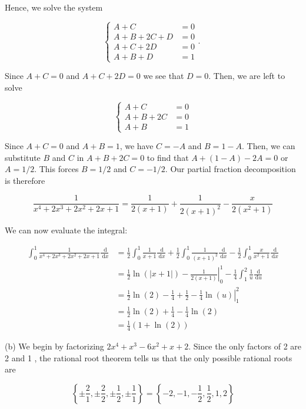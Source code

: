 \documentclass[10pt]{article}
\begin{document}
Hence, we solve the system

$$
\left\{\begin{aligned}
A+C & =0 \\
A+B+2 C+D & =0 \\
A+C+2 D & =0 \\
A+B+D & =1
\end{aligned}\right. \text {. }
$$

Since $A+C=0$ and $A+C+2 D=0$ we see that $D=0$. Then, we are left to solve

$$
\left\{\begin{aligned}
A+C & =0 \\
A+B+2 C & =0 \\
A+B & =1
\end{aligned}\right.
$$

Since $A+C=0$ and $A+B=1$, we have $C=-A$ and $B=1-A$. Then, we can substitute $B$ and $C$ in $A+B+2 C=0$ to find that $A+(1-A)-2 A=0$ or $A=1 / 2$. This forces $B=1 / 2$ and $C=-1 / 2$. Our partial fraction decomposition is therefore

$$
\frac{1}{x^{4}+2 x^{3}+2 x^{2}+2 x+1}=\frac{1}{2(x+1)}+\frac{1}{2(x+1)^{2}}-\frac{x}{2\left(x^{2}+1\right)}
$$

We can now evaluate the integral:

$$
\begin{aligned}
\int_{0}^{1} \frac{1}{x^{4}+2 x^{3}+2 x^{2}+2 x+1} \frac{\mathrm{~d}}{\mathrm{~d} x} & =\frac{1}{2} \int_{0}^{1} \frac{1}{x+1} \frac{\mathrm{~d}}{\mathrm{~d} x}+\frac{1}{2} \int_{0}^{1} \frac{1}{(x+1)^{2}} \frac{\mathrm{~d}}{\mathrm{~d} x}-\frac{1}{2} \int_{0}^{1} \frac{x}{x^{2}+1} \frac{\mathrm{~d}}{\mathrm{~d} x} \\
& =\frac{1}{2} \ln (|x+1|)-\left.\frac{1}{2(x+1)}\right|_{0} ^{1}-\frac{1}{4} \int_{1}^{2} \frac{1}{u} \frac{\mathrm{~d}}{\mathrm{~d} u} \\
& =\frac{1}{2} \ln (2)-\frac{1}{4}+\frac{1}{2}-\left.\frac{1}{4} \ln (u)\right|_{1} ^{2} \\
& =\frac{1}{2} \ln (2)+\frac{1}{4}-\frac{1}{4} \ln (2) \\
& =\frac{1}{4}(1+\ln (2))
\end{aligned}
$$

(b) We begin by factorizing $2 x^{4}+x^{3}-6 x^{2}+x+2$. Since the only factors of 2 are 2 and 1 , the rational root theorem tells us that the only possible rational roots are

$$
\left\{ \pm \frac{2}{1}, \pm \frac{2}{2}, \pm \frac{1}{2}, \pm \frac{1}{1}\right\}=\left\{-2,-1,-\frac{1}{2}, \frac{1}{2}, 1,2\right\}
$$
\end{document}
